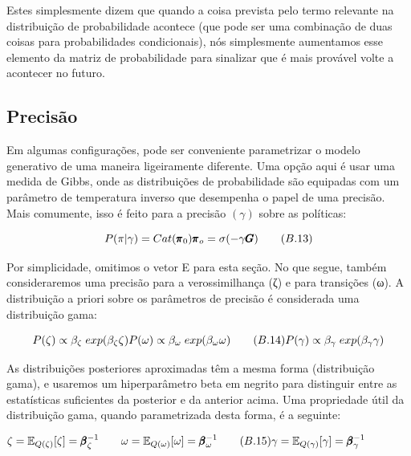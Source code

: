 \documentclass[
  12pt,
]{book}
\begin{document}
Estes simplesmente dizem que quando a coisa prevista pelo termo relevante na distribuição de probabilidade acontece (que pode ser uma combinação de duas coisas para probabilidades condicionais), nós simplesmente aumentamos esse elemento da matriz de probabilidade para sinalizar que é mais provável volte a acontecer no futuro.

\hypertarget{precisuxe3o}{%
\subsection{Precisão}\label{precisuxe3o}}

Em algumas configurações, pode ser conveniente parametrizar o modelo generativo de uma maneira ligeiramente diferente. Uma opção aqui é usar uma medida de Gibbs, onde as distribuições de probabilidade são equipadas com um parâmetro de temperatura inverso que desempenha o papel de uma precisão. Mais comumente, isso é feito para a precisão \((γ)\) sobre as políticas:

\[P(\pi | \gamma) = Cat(\pmb \pi_0) \\ 
\pmb \pi_o = \sigma(-\gamma \pmb G) \qquad (B.13)
\]

Por simplicidade, omitimos o vetor E para esta seção. No que segue, também consideraremos uma precisão para a verossimilhança (ζ) e para transições (ω). A distribuição a priori sobre os parâmetros de precisão é considerada uma distribuição gama:

\[
P(\zeta) \propto \beta_\zeta \;exp(\beta_\zeta \zeta) \\ 
P(\omega) \propto \beta_\omega \;exp(\beta_\omega \omega)  \qquad (B.14)\\
P(\gamma) \propto \beta_\gamma \;exp(\beta_\gamma \gamma) \\
\]

As distribuições posteriores aproximadas têm a mesma forma (distribuição gama), e usaremos um hiperparâmetro beta em negrito para distinguir entre as estatísticas suficientes da posterior e da anterior acima. Uma propriedade útil da distribuição gama, quando parametrizada desta forma, é a seguinte:

\[
\begin{equation}
\zeta = \mathbb E_{Q(\zeta)}[\zeta] = \pmb \beta^{-1}_{\zeta} \qquad\qquad  \\
\omega = \mathbb E_{Q(\omega)}[\omega] = \pmb \beta^{-1}_{\omega}  \qquad (B.15)\\ 
\gamma = \mathbb E_{Q(\gamma)}[\gamma] = \pmb \beta^{-1}_{\gamma} \qquad\qquad 
\end{equation}
\]
\end{document}
